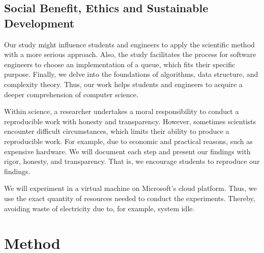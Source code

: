 \documentclass[a4paper,11pt]{kth-mag}
\newcommand*{\skippara}{\par\vspace{\baselineskip} \noindent}
\begin{document}
\subsection{Social Benefit, Ethics and Sustainable Development}
Our study might influence students and engineers to apply the scientific method with a more serious approach.
Also, the study facilitates the process for software engineers to choose an implementation of a queue, which fits their specific purpose.
Finally, we delve into the foundations of algorithms, data structure, and complexity theory.
Thus, our work helps students and engineers to acquire a deeper comprehension of computer science.

\skippara Within science, a researcher undertakes a moral responsibility to conduct a reproducible work with honesty and transparency.
However, sometimes scientists encounter difficult circumstances, which limits their ability to produce a reproducible work.
For example, due to economic and practical reasons, such as expensive hardware.
We will document each step and present our findings with rigor, honesty, and transparency.
That is, we encourage students to reproduce our findings.

\skippara We will experiment in a virtual machine on Microsoft's cloud platform.
Thus, we use the exact quantity of resources needed to conduct the experiments.
Thereby, avoiding waste of electricity due to, for example, system idle.



\clearpage

%
\section{Method}\label{sec:methods}
\end{document}
